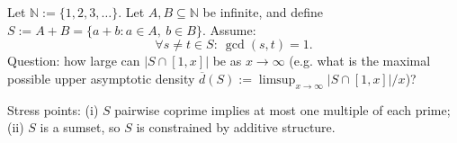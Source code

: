 Let $\mathbb N:=\{1,2,3,\dots\}$. Let $A,B\subseteq\mathbb N$ be infinite, and define $S:=A+B=\{a+b:a\in A,\ b\in B\}$. Assume:
\[
\forall s\ne t\in S:\ \gcd(s,t)=1.
\]
Question: how large can $|S\cap[1,x]|$ be as $x\to\infty$ (e.g. what is the maximal possible upper asymptotic density $\overline d(S):=\limsup_{x\to\infty}|S\cap[1,x]|/x$)?

Stress points: (i) $S$ pairwise coprime implies at most one multiple of each prime; (ii) $S$ is a sumset, so $S$ is constrained by additive structure.
